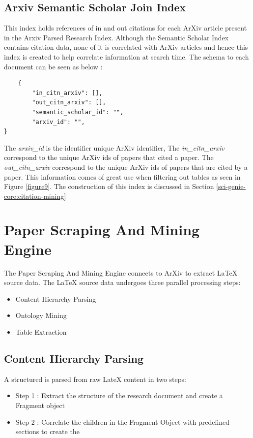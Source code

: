 \subsection{Arxiv Semantic Scholar Join Index}
\label{sci-genie-core:data-layer:ss-join-index}
This index holds references of in and out citations for each ArXiv article present in the Arxiv Parsed Research Index. Although the Semantic Scholar Index contains citation data, none of it is correlated with ArXiv articles and hence this index is created to help correlate information at search time. The schema to each document can be seen as below : 
\begin{verbatim}
    {
        "in_citn_arxiv": [],
        "out_citn_arxiv": [],
        "semantic_scholar_id": "",
        "arxiv_id": "",
}
\end{verbatim}
The \textit{arxiv\_id} is the identifier unique ArXiv identifier, The \textit{in\_citn\_arxiv} correspond to the unique ArXiv ids of papers that cited a paper. The \textit{out\_citn\_arxiv} correspond to the unique ArXiv ids of papers that are cited by a paper. This information comes of great use when filtering out tables as seen in Figure \ref{figure9}. The construction of this index is discussed in Section \ref{sci-genie-core:citation-mining}
\section{Paper Scraping And Mining Engine}
\label{sci-genie-core:scraping}
The Paper Scraping And Mining Engine connects to ArXiv to extract LaTeX source data. The LaTeX source data undergoes three parallel processing steps:
\begin{itemize}
    \item Content Hierarchy Parsing
    \item Ontology Mining
    \item Table Extraction 
\end{itemize}

\subsection{Content Hierarchy Parsing}
A structured  is parsed from raw LateX content in two steps:
\begin{itemize}
    \item Step 1 : Extract the structure of the research document and create a Fragment object
    \item Step 2 : Correlate the children in the Fragment Object with predefined sections to create the  
\end{itemize} 
